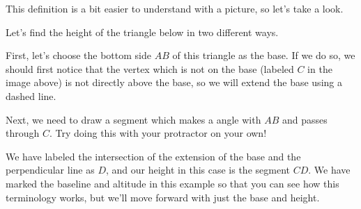 \documentclass{ximera}
\begin{document}
This definition is a bit easier to understand with a picture, so let's take a look.
\begin{example}
Let's find the height of the triangle below in two different ways.
\begin{image}
\end{image}
First, let's choose the bottom side $AB$ of this triangle as the base. If we do so, we should first notice that the vertex which is not on the base (labeled $C$ in the image above) is not directly above the base, so we will extend the base using a dashed line.
\begin{image}
\end{image}
Next, we need to draw a segment which makes a  angle with $AB$ and passes through $C$. Try doing this with your protractor on your own!
\begin{image}
\end{image}
We have labeled the intersection of the extension of the base and the perpendicular line as $D$, and our height in this case is the segment $CD$. We have marked the baseline and altitude in this example so that you can see how this terminology works, but we'll move forward with just the base and height.


\end{example}
\end{document}
